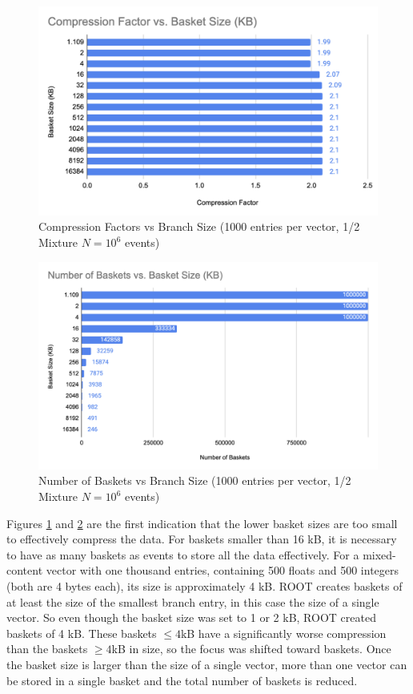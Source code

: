 \begin{figure}[h]
    \centering
    \includegraphics[width=.8\textwidth]{content/toymodel_content/Compression Factor vs. Branch Size (KB).png}
    \caption{Compression Factors vs Branch Size (1000 entries per vector, 1/2 Mixture $N=10^6$ events)}
    \label{fig:toymodel_CFvsBranchSize_1/2mixture}
\end{figure}

\begin{figure}[h]
    \centering
    \includegraphics[width=.8\textwidth]{content/toymodel_content/Number of Baskets vs Branch Size.png}
    \caption{Number of Baskets vs Branch Size (1000 entries per vector, 1/2 Mixture $N=10^6$ events)}
    \label{fig:toymodel_NumBasketsvsBranchSize_1/2mixture}
\end{figure}

Figures \ref{fig:toymodel_CFvsBranchSize_1/2mixture} and \ref{fig:toymodel_NumBasketsvsBranchSize_1/2mixture} are the first indication that the lower basket sizes are too small to effectively compress the data. 
For baskets smaller than 16 kB, it is necessary to have as many baskets as events to store all the data effectively.
For a mixed-content vector with one thousand entries, containing 500 floats and 500 integers (both are 4 bytes each), its size is approximately 4 kB.
ROOT creates baskets of at least the size of the smallest branch entry, in this case the size of a single vector.
So even though the basket size was set to 1 or 2 kB, ROOT created baskets of 4 kB.
These baskets $\leq 4$kB have a significantly worse compression than the baskets $\geq 4$kB in size, so the focus was shifted toward baskets.  
Once the basket size is larger than the size of a single vector, more than one vector can be stored in a single basket and the total number of baskets is reduced.

